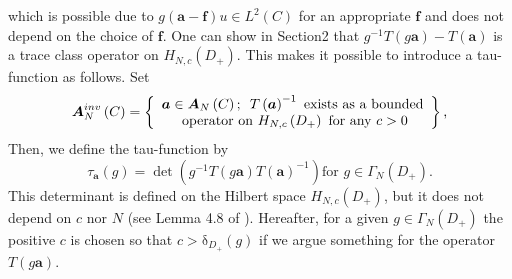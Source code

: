 \documentclass[a4paper]{article}%
\begin{document}
which is possible due to $g\left(  \boldsymbol{a}-\boldsymbol{f}\right)  u\in
L^{2}\left(  C\right)  $ for an appropriate $\boldsymbol{f}$ and does not
depend on the choice of $\boldsymbol{f}$. One can show in Section2 that
$g^{-1}T\left(  g\boldsymbol{a}\right)  -T\left(  \boldsymbol{a}\right)  $ is
a trace class operator on $H_{N,c}\left(  D_{+}\right)  $. This makes it
possible to introduce a tau-function as follows. Set%
\begin{equation}
\boldsymbol{A}_{N}^{inv}\left(  C\right)  =\left\{
\begin{array}
[c]{c}%
\boldsymbol{a}\in\boldsymbol{A}_{N}\left(  C\right)  \text{; \ }T\left(
\boldsymbol{a}\right)  ^{-1}\text{ exists as a bounded}\\
\text{ operator on }H_{N,c}\left(  D_{+}\right)  \text{ for any }c>0
\end{array}
\right\}  \text{,}\label{1-10}%
\end{equation}
Then, we define the tau-function by%
\begin{equation}
\tau_{\boldsymbol{a}}\left(  g\right)  =\det\left(  g^{-1}T\left(
g\boldsymbol{a}\right)  T\left(  \boldsymbol{a}\right)  ^{-1}\right)  \text{
\ for }g\in\Gamma_{N}\left(  D_{+}\right)  \text{.}\label{1-11}%
\end{equation}
This determinant is defined on the Hilbert space $H_{N,c}\left(  D_{+}\right)
$, but it does not depend on $c$ nor $N$ (see Lemma 4.8 of \cite{k2}).
Hereafter, for a given $g\in\Gamma_{N}\left(  D_{+}\right)  $ the positive $c$
is chosen so that $c>\mathrm{\delta}_{D_{+}}\left(  g\right)  $ if we argue
something for the operator $T\left(  g\boldsymbol{a}\right)  $.
\end{document}

